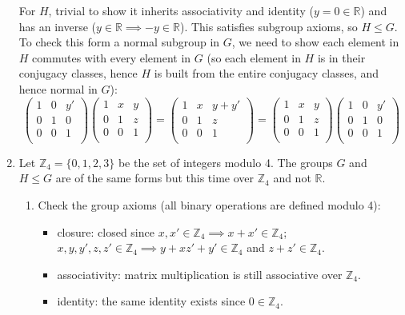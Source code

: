 \documentclass[a4paper]{article}
\begin{document}
\begin{ans}
\begin{enumerate}[label=(\alph*)]
For $H$, trivial to show it inherits associativity and identity ($y=0\in\mathbb{R}$) and has an inverse ($y\in\mathbb{R}\implies -y\in\mathbb{R}$). This satisfies subgroup axioms, so $H\leq G$.\\[5pt]
To check this form a normal subgroup in $G$, we need to show each element in $H$ commutes with every element in $G$ (so each element in $H$ is in their conjugacy classes, hence $H$ is built from the entire conjugacy classes, and hence normal in $G$):
$$ \begin{pmatrix}1&0&y'\\0&1&0\\0&0&1\\\end{pmatrix} \begin{pmatrix}1&x&y\\0&1&z\\0&0&1\\\end{pmatrix}= \begin{pmatrix}1&x&y+y'\\0&1&z\\0&0&1\\\end{pmatrix}=\begin{pmatrix}1&x&y\\0&1&z\\0&0&1\\\end{pmatrix}\begin{pmatrix}1&0&y'\\0&1&0\\0&0&1\\\end{pmatrix}$$
\item Let $\mathbb{Z}_4=\{0,1,2,3\}$ be the set of integers modulo 4. The groups $G$ and $H\leq G$ are of the same forms but this time over $\mathbb{Z}_4$ and not $\mathbb{R}$.
\begin{enumerate}[label=(\roman*)]
\item Check the group axioms (all binary operations are defined modulo 4):
\begin{itemize}
    \item closure: closed since $x,x'\in\mathbb{Z}_4\implies x+x'\in\mathbb{Z}_4$; $x,y,y',z,z'\in\mathbb{Z}_4\implies y+xz'+y'\in\mathbb{Z}_4$ and $z+z'\in\mathbb{Z}_4$.
    \item associativity: matrix multiplication is still associative over $\mathbb{Z}_4$.
    \item identity: the same identity exists since $0\in\mathbb{Z}_4$.

\end{itemize}
\end{enumerate}
\end{enumerate}
\end{ans}
\end{document}
